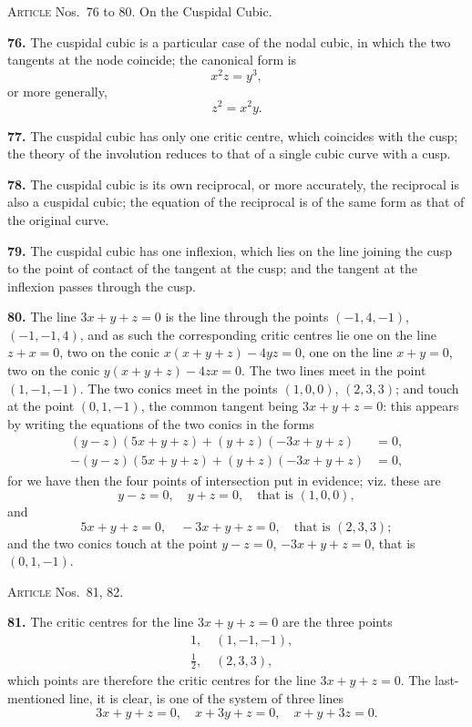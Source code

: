 \documentclass[11pt,a4paper]{article}
\theoremstyle{plain}
\theoremstyle{definition}
\begin{document}
\bigskip

\noindent\textsc{Article} Nos.~76 to 80.  On the Cuspidal Cubic.

\medskip

\textbf{76.} The cuspidal cubic is a particular case of the nodal cubic, in which the two tangents at the node coincide; the canonical form is
\[
x^2z = y^3,
\]
or more generally,
\[
z^2 = x^2y.
\]

\textbf{77.} The cuspidal cubic has only one critic centre, which coincides with the cusp; the theory of the involution reduces to that of a single cubic curve with a cusp.

\textbf{78.} The cuspidal cubic is its own reciprocal, or more accurately, the reciprocal is also a cuspidal cubic; the equation of the reciprocal is of the same form as that of the original curve.

\textbf{79.} The cuspidal cubic has one inflexion, which lies on the line joining the cusp to the point of contact of the tangent at the cusp; and the tangent at the inflexion passes through the cusp.

\textbf{80.} The line $3x + y + z = 0$ is the line through the points $(-1, 4, -1)$, $(-1, -1, 4)$, and as such the corresponding critic centres lie
one on the line $z + x = 0$, two on the conic $x(x + y + z) - 4yz = 0$,
one on the line $x + y = 0$, two on the conic $y(x + y + z) - 4zx = 0$.
The two lines meet in the point $(1, -1, -1)$.
The two conics meet in the points $(1, 0, 0)$, $(2, 3, 3)$; and touch at the point $(0, 1, -1)$, the common tangent being $3x + y + z = 0$: this appears by writing the equations of the two conics in the forms
\begin{align*}
(y - z)(5x + y + z) + (y + z)(-3x + y + z) &= 0, \\
-(y - z)(5x + y + z) + (y + z)(-3x + y + z) &= 0,
\end{align*}
for we have then the four points of intersection put in evidence; viz. these are
\[
y - z = 0,\quad y + z = 0,\quad \text{that is }(1, 0, 0),
\]
and
\[
5x + y + z = 0,\quad -3x + y + z = 0,\quad \text{that is }(2, 3, 3);
\]
and the two conics touch at the point $y - z = 0$, $-3x + y + z = 0$, that is $(0, 1, -1)$.

\bigskip

\noindent\textsc{Article} Nos.~81, 82.

\medskip

\textbf{81.} The critic centres for the line $3x + y + z = 0$ are the three points
\begin{align*}
&1,\quad (1, -1, -1), \\
&\tfrac{1}{2},\quad (2, 3, 3),
\end{align*}
which points are therefore the critic centres for the line $3x + y + z = 0$.
The last-mentioned line, it is clear, is one of the system of three lines
\[
3x + y + z = 0,\quad x + 3y + z = 0,\quad x + y + 3z = 0.
\]
\end{document}
